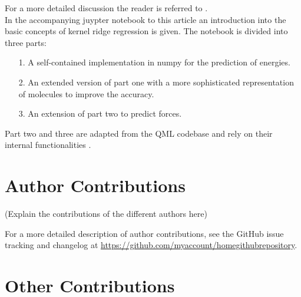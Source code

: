 \documentclass[9pt,bestpractices]{livecoms}
\newcommand{\githubrepository}{\url{https://github.com/myaccount/homegithubrepository}}  %
\begin{document}
For a more detailed discussion the reader is referred to \cite{Murphy2013, Vu2015}.
\\
In the accompanying juypter notebook to this article an introduction into the basic concepts of kernel ridge regression is given. The notebook is divided into three parts:
\begin{itemize}
    \item[1.] A self-contained implementation in numpy for the prediction of energies.
    \item[2.] An extended version of part one with a more sophisticated representation of  molecules to improve the accuracy. 
    \item[3.] An extension of part two to predict forces. 
\end{itemize}
Part two and three are adapted from the QML codebase and rely on their internal functionalities \cite{Christensen2017}. 

\section*{Author Contributions}
%

(Explain the contributions of the different authors here)

For a more detailed description of author contributions,
see the GitHub issue tracking and changelog at \githubrepository.

\section*{Other Contributions}
%
\end{document}

